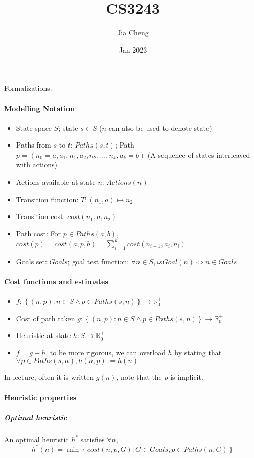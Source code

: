 \documentclass[a4paper]{article}
\title{CS3243}
\author{Jia Cheng}
\date{Jan 2023}
\newcommand{\set}[1]{\left\lbrace #1 \right\rbrace} %
\newcommand{\reals}[0]{\mathbb{R}} %
\begin{document}
\maketitle

Formalizations.

\paragraph{Modelling Notation}
\begin{itemize}
    \item State space $S$; state $s\in S$ ($n$ can also be used to denote state)
    \item Paths from $s$ to $t$: $Paths(s, t)$; Path $p = (n_0 = a, a_1, n_1, a_2, n_2,\dots, n_k, a_k = b)$ (A sequence of states interleaved with actions)
    \item Actions available at state $n$: $Actions(n)$
    \item Transition function: $T: (n_1, a)\mapsto n_2$
    \item Transition cost: $cost(n_1, a, n_2)$
    \item Path cost: For $p\in Paths(a, b)$, $cost(p) = cost(a, p, b) = \sum_{i=1}^k cost(n_{i-1}, a_i, n_i)$
    \item Goals set: $Goals$; goal test function: $\forall n\in S, isGoal(n)\iff n\in Goals$
\end{itemize}

\paragraph{Cost functions and estimates}
\begin{itemize}
    \item $f: \set{(n, p) : n\in S\land p\in Paths(s, n)}\rightarrow \reals_0^+$
    \item Cost of path taken $g: \set{(n, p) : n\in S\land p\in Paths(s, n)}\rightarrow \reals_0^+$
    \item Heuristic at state $h: S\rightarrow \reals_0^+$
    \item $f = g + h$, to be more rigorous, we can overload $h$ by stating that $\forall p\in Paths(s, n), h(n, p) := h(n)$
\end{itemize}
In lecture, often it is written $g(n)$, note that the $p$ is implicit.

\paragraph{Heuristic properties}
\subparagraph{Optimal heuristic} An optimal heuristic $h^*$ satisfies $\forall n$,
\begin{equation}
    h^*(n) = \min\set{cost(n, p, G) : G\in Goals, p\in Paths(n, G)}
\end{equation}
\end{document}
